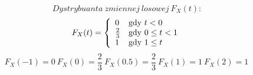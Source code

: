 \begin{zad}
$$
Dystrybuanta\ zmiennej\ losowej\ F_X(t):
$$
$$
F_X(t)
 = \left\{ \begin{array}{ll}
0 & \textrm{gdy $t < 0$}\\
\frac{2}{3} & \textrm{gdy $ 0 \leq t < 1 $}\\
1 & \textrm{gdy $1 \leq t$}
\end{array} \right.
$$
$$
F_X(-1) = 0\
F_X(0) = \frac{2}{3}\
F_X(0.5) = \frac{2}{3}\
F_X(1) = 1\
F_X(2) = 1\


$$
\end{zad}
